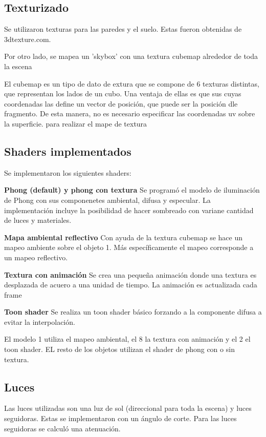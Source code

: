 \documentclass[12pt]{article}
\begin{document}
\subsection{Texturizado}
Se utilizaron texturas para las paredes y el suelo. Estas fueron obtenidas de 3dtexture.com. 

Por otro lado, se mapea un 'skybox' con una textura cubemap alrededor de toda la escena 

El cubemap es un tipo de dato de extura que se compone de 6 texturas distintas, que representan los lados de un cubo. Una  ventaja de ellas es que sus cuyas coordenadas las define un vector de posición, que puede ser la posición dle fragmento. De esta manera, no es necesario especificar las coordenadas uv sobre la superficie. para realizar el mape de textura

\subsection{Shaders implementados}
Se implementaron los siguientes shaders:

\textbf{Phong (default) y phong con textura}
Se programó el modelo de iluminación de Phong con sus componenetes ambiental, difusa y especular. La implementación incluye la posibilidad de hacer sombreado con variane cantidad de luces y materiales.

\textbf{Mapa ambiental reflectivo}
Con ayuda de la textura cubemap se hace un mapeo ambiente sobre el objeto 1. Más específicamente el mapeo corresponde a un mapeo reflectivo. 

\textbf{Textura con animación}
Se crea una pequeña animación donde una textura es desplazada de acuero a una unidad de tiempo. La animación es actualizada cada frame

\textbf{Toon shader} 
Se realiza un toon shader básico forzando a la componente difusa a evitar la interpolación.

El modelo 1 utiliza el mapeo ambiental, el 8 la textura con animación y el 2 el toon shader. EL resto de los objetos utilizan el shader de phong con o sin textura.

\subsection{Luces}
Las luces utilizadas son una luz de sol (direccional para toda la escena) y luces seguidoras. Estas se implementaron con un ángulo de corte. Para las luces seguidoras se calculó una atenuación.
\end{document}
